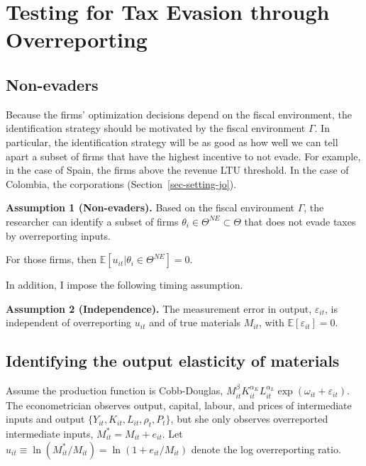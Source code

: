 \documentclass[
  12pt,
  letterpaper,
  oneside,
  openany]{report}
\newcounter{none} %
\begin{document}

\chapter{Testing for Tax Evasion through
Overreporting}\label{sec-testing}

\section{Non-evaders}\label{sec-testing-nonevaders}

Because the firms' optimization decisions depend on the fiscal
environment, the identification strategy should be motivated by the
fiscal environment \(\Gamma\). In particular, the identification
strategy will be as good as how well we can tell apart a subset of firms
that have the highest incentive to not evade. For example, in the case
of Spain, the firms above the revenue LTU threshold. In the case of
Colombia, the corporations (Section~\ref{sec-setting-jo}).

\textbf{Assumption 1 (Non-evaders).} Based on the fiscal environment
\(\Gamma\), the researcher can identify a subset of firms
\(\theta_i\in\Theta^{NE}\subset \Theta\) that does not evade taxes by
overreporting inputs.

For those firms, then \(\mathbb{E}[u_{it}|\theta_i\in\Theta^{NE}]=0\).

In addition, I impose the following timing assumption.

\textbf{Assumption 2 (Independence).} The measurement error in output,
\(\varepsilon_{it}\), is independent of overreporting \(u_{it}\) and of
true materials \(M_{it}\), with \(\mathbb{E}[\varepsilon_{it}]=0\).

\section{Identifying the output elasticity of
materials}\label{sec-testing-beta}

Assume the production function is Cobb-Douglas,
\(M^{\beta}_{it}K_{it}^{\alpha_K}L_{it}^{\alpha_L}\exp(\omega_{it}+\varepsilon_{it})\).
The econometrician observes output, capital, labour, and prices of
intermediate inputs and output \(\{Y_{it},K_{it},L_{it},\rho_t, P_t\}\),
but she only observes overreported intermediate inputs,
\(M^*_{it}=M_{it}+e_{it}\). Let
\(u_{it}\equiv\ln(M^*_{it}/M_{it})=\ln(1+e_{it}/M_{it})\) denote the log
overreporting ratio.
\end{document}
